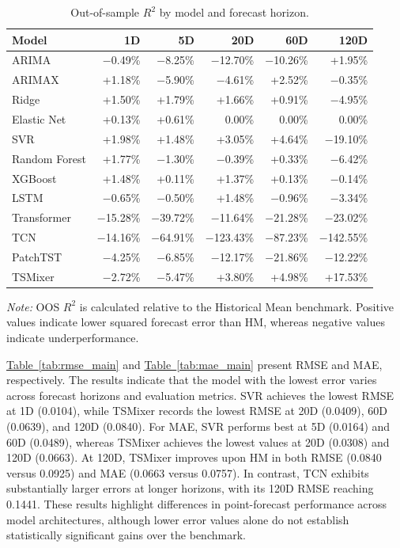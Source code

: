 \documentclass[12pt,twoside]{ord}
\makeatletter
\providecommand{\FloatBarrier}{\par\ifx\@deferlist\@empty\else\clearpage\fi}
\makeatother
\begin{document}
\begin{table}[htbp]
\centering
\caption{Out-of-sample $R^2$ by model and forecast horizon.}\label{tab:oos_r2_main}
\setlength{\tabcolsep}{4.5pt}
\begin{tabular}{lrrrrr}
\hline
Model & 1D & 5D & 20D & 60D & 120D \\
\hline
ARIMA & $-$0.49\% & $-$8.25\% & $-$12.70\% & $-$10.26\% & +1.95\% \\
ARIMAX & +1.18\% & $-$5.90\% & $-$4.61\% & +2.52\% & $-$0.35\% \\
Ridge & +1.50\% & +1.79\% & +1.66\% & +0.91\% & $-$4.95\% \\
Elastic Net & +0.13\% & +0.61\% & 0.00\% & 0.00\% & 0.00\% \\
SVR & +1.98\% & +1.48\% & +3.05\% & +4.64\% & $-$19.10\% \\
Random Forest & +1.77\% & $-$1.30\% & $-$0.39\% & +0.33\% & $-$6.42\% \\
XGBoost & +1.48\% & +0.11\% & +1.37\% & +0.13\% & $-$0.14\% \\
LSTM & $-$0.65\% & $-$0.50\% & +1.48\% & $-$0.96\% & $-$3.34\% \\
Transformer & $-$15.28\% & $-$39.72\% & $-$11.64\% & $-$21.28\% & $-$23.02\% \\
TCN & $-$14.16\% & $-$64.91\% & $-$123.43\% & $-$87.23\% & $-$142.55\% \\
PatchTST & $-$4.25\% & $-$6.85\% & $-$12.17\% & $-$21.86\% & $-$12.22\% \\
TSMixer & $-$2.72\% & $-$5.47\% & +3.80\% & +4.98\% & +17.53\% \\
\hline
\end{tabular}
\par\vspace{4pt}\parbox{0.85\linewidth}{\fontsize{9pt}{12pt}\selectfont\textit{Note:} OOS $R^2$ is calculated relative to the Historical Mean benchmark. Positive values indicate lower squared forecast error than HM, whereas negative values indicate underperformance.}
\end{table}

\FloatBarrier

\hyperref[tab:rmse_main]{Table~\ref*{tab:rmse_main}} and \hyperref[tab:mae_main]{Table~\ref*{tab:mae_main}} present RMSE and MAE, respectively. The results indicate that the model with the lowest error varies across forecast horizons and evaluation metrics. SVR achieves the lowest RMSE at 1D (0.0104), while TSMixer records the lowest RMSE at 20D (0.0409), 60D (0.0639), and 120D (0.0840). For MAE, SVR performs best at 5D (0.0164) and 60D (0.0489), whereas TSMixer achieves the lowest values at 20D (0.0308) and 120D (0.0663). At 120D, TSMixer improves upon HM in both RMSE (0.0840 versus 0.0925) and MAE (0.0663 versus 0.0757). In contrast, TCN exhibits substantially larger errors at longer horizons, with its 120D RMSE reaching 0.1441. These results highlight differences in point-forecast performance across model architectures, although lower error values alone do not establish statistically significant gains over the benchmark.
\end{document}
